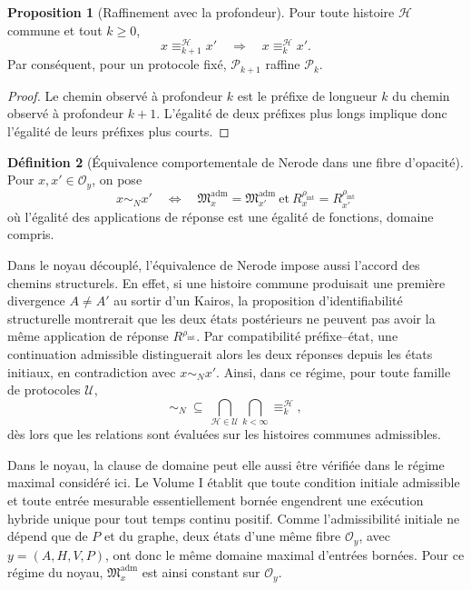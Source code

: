 \documentclass[11pt,a4paper]{article}
\theoremstyle{definition}
\newtheorem{definition}{Définition}[section]
\newtheorem{propositionthm}[definition]{Proposition}
\theoremstyle{remark}
\newcommand{\Madm}{\mathfrak M^{\mathrm{adm}}}
\begin{document}
\begin{propositionthm}[Raffinement avec la profondeur]
Pour toute histoire $\mathcal H$ commune et tout $k\geq0$,
\[
\boxed{
 x\equiv_{k+1}^{\mathcal H}x'
 \quad\Longrightarrow\quad
 x\equiv_k^{\mathcal H}x'.}
\]
Par conséquent, pour un protocole fixé, $\mathcal P_{k+1}$ raffine $\mathcal P_k$.
\end{propositionthm}

\begin{proof}
Le chemin observé à profondeur $k$ est le préfixe de longueur $k$ du chemin observé à profondeur $k+1$. L'égalité de deux préfixes plus longs implique donc l'égalité de leurs préfixes plus courts.
\end{proof}

\begin{definition}[Équivalence comportementale de Nerode dans une fibre d'opacité]
Pour $x,x'\in \mathcal O_y$, on pose
\[
\boxed{
 x\sim_N x'
 \quad\Longleftrightarrow\quad
 \Madm_x=\Madm_{x'}
 \ \text{et}\ 
 R_x^{\rho_{\mathrm{int}}}=R_{x'}^{\rho_{\mathrm{int}}}}
\]
où l'égalité des applications de réponse est une égalité de fonctions, domaine compris.
\end{definition}

Dans le noyau découplé, l'équivalence de Nerode impose aussi l'accord des chemins structurels. En effet, si une histoire commune produisait une première divergence $A\neq A'$ au sortir d'un Kairos, la proposition d'identifiabilité structurelle montrerait que les deux états postérieurs ne peuvent pas avoir la même application de réponse $R^{\rho_{\mathrm{int}}}$. Par compatibilité préfixe--état, une continuation admissible distinguerait alors les deux réponses depuis les états initiaux, en contradiction avec $x\sim_Nx'$. Ainsi, dans ce régime, pour toute famille de protocoles $\mathcal U$,
\[
\boxed{
\sim_N\ \subseteq\
\bigcap_{\mathcal H\in\mathcal U}
\bigcap_{k<\infty}\equiv_k^{\mathcal H},}
\]
dès lors que les relations sont évaluées sur les histoires communes admissibles.

Dans le noyau, la clause de domaine peut elle aussi être vérifiée dans le régime maximal considéré ici. Le Volume I établit que toute condition initiale admissible et toute entrée mesurable essentiellement bornée engendrent une exécution hybride unique pour tout temps continu positif. Comme l'admissibilité initiale ne dépend que de $P$ et du graphe, deux états d'une même fibre $\mathcal O_y$, avec $y=(A,H,V,P)$, ont donc le même domaine maximal d'entrées bornées. Pour ce régime du noyau, $\Madm_x$ est ainsi constant sur $\mathcal O_y$.
\end{document}
